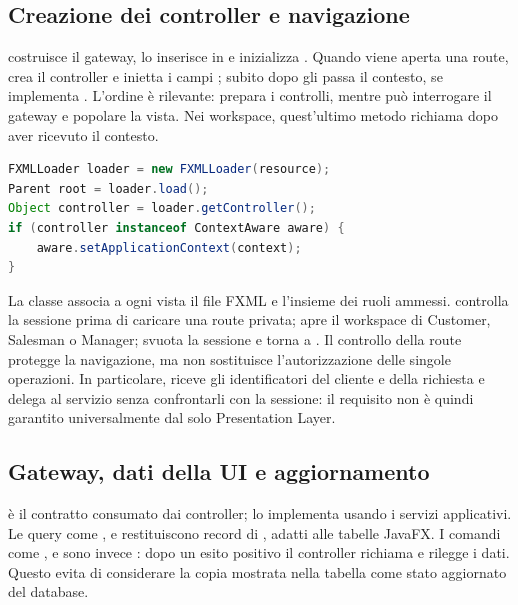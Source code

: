 \subsection{Creazione dei controller e navigazione}
 costruisce il gateway, lo inserisce in  e inizializza . Quando viene aperta una route,  crea il controller e inietta i campi ; subito dopo  gli passa il contesto, se implementa . L'ordine è rilevante:  prepara i controlli, mentre  può interrogare il gateway e popolare la vista. Nei workspace, quest'ultimo metodo richiama  dopo aver ricevuto il contesto.

\begin{lstlisting}[language=Java,caption={Passaggio del contesto dopo il caricamento della vista.},label={lst:context-aware}]
FXMLLoader loader = new FXMLLoader(resource);
Parent root = loader.load();
Object controller = loader.getController();
if (controller instanceof ContextAware aware) {
    aware.setApplicationContext(context);
}
\end{lstlisting}

La classe  associa a ogni vista il file FXML e l'insieme dei ruoli ammessi.  controlla la sessione prima di caricare una route privata;  apre il workspace di Customer, Salesman o Manager;  svuota la sessione e torna a . Il controllo della route protegge la navigazione, ma non sostituisce l'autorizzazione delle singole operazioni. In particolare,  riceve gli identificatori del cliente e della richiesta e delega al servizio senza confrontarli con la sessione: il requisito  non è quindi garantito universalmente dal solo Presentation Layer.

\subsection{Gateway, dati della UI e aggiornamento}
 è il contratto consumato dai controller;  lo implementa usando i servizi applicativi. Le query come ,  e  restituiscono record di , adatti alle tabelle JavaFX. I comandi come ,  e  sono invece : dopo un esito positivo il controller richiama  e rilegge i dati. Questo evita di considerare la copia mostrata nella tabella come stato aggiornato del database.

